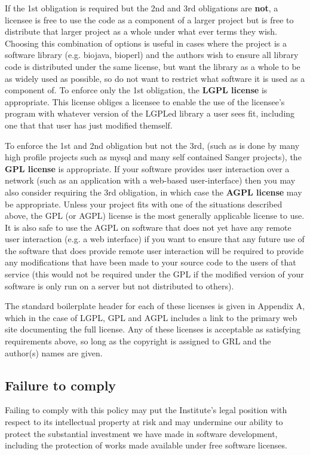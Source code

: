 \documentclass[10pt,a4paper]{article}
\begin{document}
If the 1st obligation is required but the 2nd and 3rd obligations are \textbf{not}, a licensee is free 
to use the code as a component of a larger project but is free to distribute that larger 
project as a whole under what ever terms they wish. Choosing this combination of 
options is useful in cases where the project is a software library (e.g. biojava, bioperl) 
and the authors wish to ensure all library code is distributed under the same license, 
but want the library as a whole to be as widely used as possible, so do not want to 
restrict what software it is used as a component of. To enforce only the 1st obligation, 
the \textbf{LGPL license} is appropriate. This license obliges a licensee to enable the use of the 
licensee's program with whatever version of the LGPLed library a user sees fit, 
including one that that user has just modified themself. 

To enforce the 1st and 2nd obligation but not the 3rd, (such as is done by many high 
profile projects such as mysql and many self contained Sanger projects), the \textbf{GPL 
license} is appropriate. If your software provides user interaction over a network (such 
as an application with a web-based user-interface) then you may also consider requiring 
the 3rd obligation, in which case the \textbf{AGPL license} may be appropriate. Unless your 
project fits with one of the situations described above, the GPL (or AGPL) license is the 
most generally applicable license to use. It is also safe to use the AGPL on software that 
does not yet have any remote user interaction (e.g. a web interface) if you want to 
ensure that any future use of the software that does provide remote user interaction will 
be required to provide any modifications that have been made to your source code to 
the users of that service (this would not be required under the GPL if the modified 
version of your software is only run on a server but not distributed to others). 
 
The standard boilerplate header for each of these licenses is given in Appendix A, 
which in the case of LGPL, GPL and AGPL includes a link to the primary web site 
documenting the full license. Any of these licenses is acceptable as satisfying 
requirements above, so long as the copyright is assigned to GRL 
and the author(s) names are given.



\subsection{Failure to comply}
\label{section:policy.copyright.failure}
\par Failing to comply with this policy may put the Institute's legal position with respect 
to its intellectual property at risk and may undermine our ability to protect the 
substantial investment we have made in software development, including the protection 
of works made available under free software licenses. 
\end{document}
